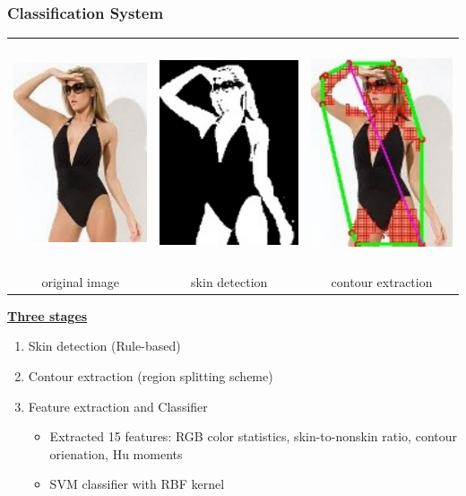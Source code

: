 \documentclass{beamer}
\begin{document}
\begin{frame}
\frametitle{Classification System}
\begin{center}
		\begin{tabular}[c]{ccc}
		\ \ \includegraphics[width=.13\columnwidth]{images/orig.pdf}  \ \ &
		\ \ \includegraphics[width=.13\columnwidth]{images/skin.pdf} \ \ &
		\ \ \includegraphics[width=.13\columnwidth]{images/grid.pdf} \ \ \\
			original image & skin detection & contour extraction \\
		\end{tabular}
\end{center}

{\underline {\bf Three stages}}

     \begin{enumerate}

        \item Skin detection (Rule-based)
        \item Contour extraction (region splitting scheme)
		\item Feature extraction and Classifier
		  \begin{itemize}
			\item Extracted 15 features: RGB color statistics, skin-to-nonskin ratio, contour orienation, Hu moments
	        \item SVM classifier with RBF kernel
	       \end{itemize}
	\end{enumerate}

\end{frame}
\end{document}
